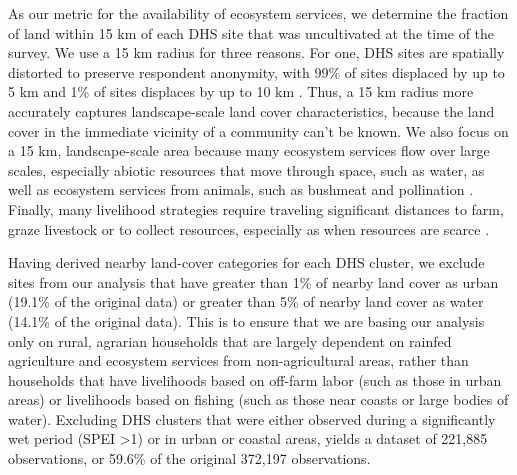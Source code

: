 \documentclass[titlepage]{article}
\begin{document}
As our metric for the availability of ecosystem services, we determine the fraction of land within 15 km of each DHS site that was uncultivated at the time of the survey.  We use a 15 km radius for three reasons.  For one, DHS sites are spatially distorted to preserve respondent anonymity, with 99\% of sites displaced by up to 5 km and 1\% of sites displaces by up to 10 km \citep{Grace2012}.  Thus, a 15 km radius more accurately captures landscape-scale land cover characteristics, because the land cover in the immediate vicinity of a community can't be known.  We also focus on a 15 km, landscape-scale area because many ecosystem services flow over large scales, especially abiotic resources that move through space, such as water, as well as ecosystem services from animals, such as bushmeat and pollination \citep{Lopez-Hoffman2010}.  Finally, many livelihood strategies require traveling significant distances to farm, graze livestock or to collect resources, especially as when resources are scarce \citep{Felardo2016, Arku2010}.

Having derived nearby land-cover categories for each DHS cluster, we exclude sites from our analysis that have greater than 1\% of nearby land cover as urban (19.1\% of the original data) or greater than 5\% of nearby land cover as water (14.1\% of the original data).  This is to ensure that we are basing our analysis only on rural, agrarian households that are largely dependent on rainfed agriculture and ecosystem services from non-agricultural areas, rather than households that have livelihoods based on off-farm labor (such as those in urban areas) or livelihoods based on fishing (such as those near coasts or large bodies of water).  Excluding DHS clusters that were either observed during a significantly wet period (SPEI \textgreater 1) or in urban or coastal areas, yields a dataset of 221,885 observations, or 59.6\% of the original 372,197 observations.
\end{document}

